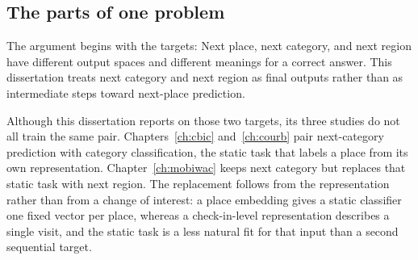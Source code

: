 \subsection{The parts of one problem}
The argument begins with the targets: Next place, next category, and next region have
different output spaces and different meanings for a correct answer. This dissertation
treats next category and next region as final outputs rather than as intermediate
steps toward next-place prediction.

Although this dissertation reports on those two targets, its three studies do not all
train the same pair. Chapters~\ref{ch:cbic}
and~\ref{ch:courb} pair next-category prediction with category classification, the
static task that labels a place from its own representation.
Chapter~\ref{ch:mobiwac} keeps next category but replaces that static task with next
region. The replacement follows from the representation rather than from a change of
interest: a place embedding gives a static classifier one fixed vector per place,
whereas a check-in-level representation describes a single visit, and the static task
is a less natural fit for that input than a second sequential target.

